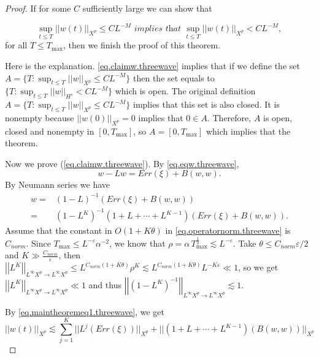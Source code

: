 \begin{proof}
If for some $C$ sufficiently large we can show that

\begin{equation}\label{eq.claimw.threewave}
    \sup _{t\le T}||w(t)||_{X^p}\le CL^{-M}\textit{  implies that } \sup _{t\le T}||w(t)||_{X^p}< CL^{-M},
\end{equation}
for all $T\le T_{\text{max}}$, then we finish the proof of this theorem. 

Here is the explanation. \eqref{eq.claimw.threewave} implies that if we define the set $A=\{T: \sup _{t\le T}||w||_{X^p}\le CL^{-M}\}$ then the set equals to $\{T: \sup _{t\le T}||w||_{H^s}< CL^{-M}\}$ which is open. The original definition $A=\{T: \sup _{t\le T}||w||_{X^p}\le CL^{-M}\}$ implies that this set is also closed. It is nonempty because $||w(0)||_{X^p}=0$ implies that $0\in A$. Therefore, $A$ is open, closed and nonempty in $[0,T_{\text{max}}]$, so $A=[0,T_{\text{max}}]$ which implies that the theorem.

Now we prove (\ref{eq.claimw.threewave}). By \eqref{eq.eqw.threewave}, 
\begin{equation}
    w-Lw= Err(\xi)+B(w,w).
\end{equation}
By Neumann series we have
\begin{equation}\label{eq.maintheoremeq1.threewave}
    \begin{split}
        w=& (1-L)^{-1}(Err(\xi)+B(w,w))
        \\
        =&(1-L^K)^{-1}(1+L+\cdots+L^{K-1})(Err(\xi)+B(w,w)).
    \end{split}
\end{equation}
Assume that the constant in $O(1+K\theta)$ in \eqref{eq.operatornorm.threewave} is $C_{norm}$. Since $T_{\text{max}}\le L^{-\varepsilon} \alpha^{-2}$, we know that $\rho=\alpha\, T^{\frac{1}{2}}_{\text{max}}\lesssim L^{-\varepsilon}$. Take $\theta\le C_{norm}\varepsilon/2$ and $K\gg \frac{C_{norm}}{\varepsilon}$, then $\left|\left|L^K\right|\right|_{L^{\infty}X^p\rightarrow L^{\infty}X^p}\le L^{C_{norm}(1+K\theta)}\rho^K\lesssim L^{C_{norm}(1+K\theta)} L^{-K\varepsilon}\ll 1$, so we get $\left|\left|L^K\right|\right|_{L^{\infty}X^p\rightarrow L^{\infty}X^p}\ll 1$ and thus $\left|\left|(1-L^K)^{-1}\right|\right|_{L^{\infty}X^p\rightarrow L^{\infty}X^p}\lesssim 1$. 

By \eqref{eq.maintheoremeq1.threewave}, we get
\begin{equation}
    ||w(t)||_{X^p}\lesssim \sum_{j=1}^K||L^j(Err(\xi))||_{X^p}+ ||(1+L+\cdots+L^{K-1})(B(w,w))||_{X^p}
\end{equation}


\end{proof}
